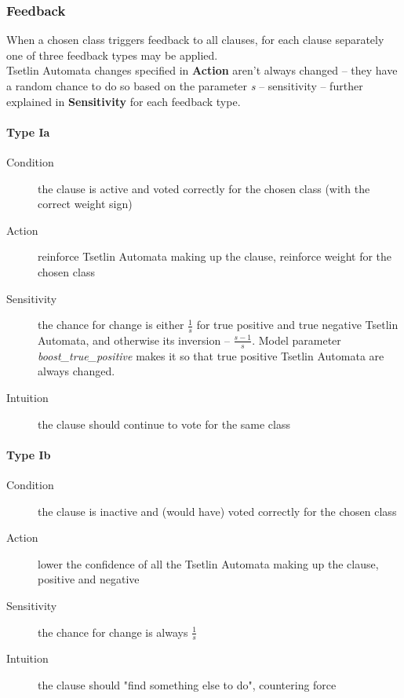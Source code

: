 \documentclass[english]{aghengthesis} %
\begin{document}
\subsubsection{Feedback}
\label{feedback-dense}
When a chosen class triggers feedback to all clauses, for each clause separately one of three feedback types may be applied. \\
Tsetlin Automata changes specified in \textbf{Action} aren't always changed -- they have a random chance to do so based on the parameter \textit{s} -- sensitivity -- further explained in \textbf{Sensitivity} for each feedback type. \\

\paragraph{Type Ia}
\begin{description}
    \item[Condition] the clause is active and voted correctly for the chosen class (with the correct weight sign)
    \item[Action] reinforce Tsetlin Automata making up the clause, reinforce weight for the chosen class
    \item[Sensitivity] the chance for change is either \( \frac{1}{s} \) for true positive and true negative Tsetlin Automata, and otherwise its inversion -- \( \frac{s - 1}{s} \). Model parameter \textit{boost\_true\_positive} makes it so that true positive Tsetlin Automata are always changed.
    \item[Intuition] the clause should continue to vote for the same class
\end{description}

\paragraph{Type Ib}
\begin{description}
    \item[Condition] the clause is inactive and (would have) voted correctly for the chosen class
    \item[Action] lower the confidence of all the Tsetlin Automata making up the clause, positive and negative
    \item[Sensitivity] the chance for change is always \( \frac{1}{s} \)
    \item[Intuition] the clause should "find something else to do", countering force
\end{description}
\end{document}
